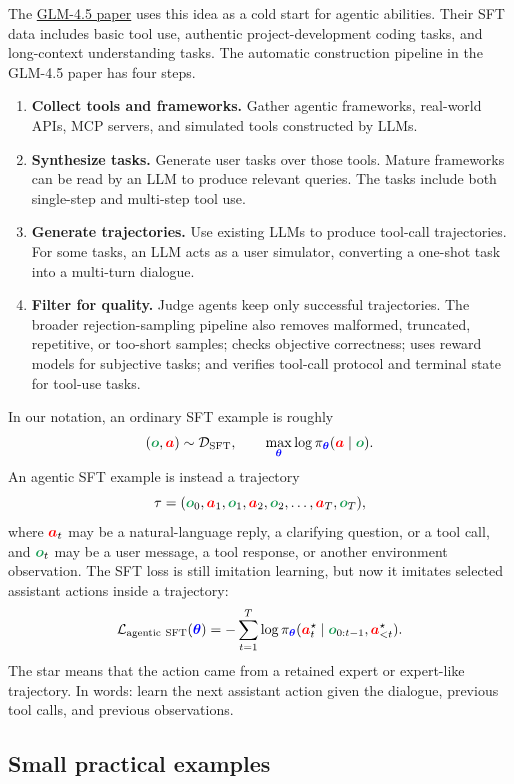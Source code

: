 \documentclass{article}
\newcommand{\colsym}[2]{\ensuremath{\textcolor{#1}{\boldsymbol{#2}}}}
\newcommand{\action}{\colsym{red}{a}}
\newcommand{\obs}{\colsym{ForestGreen}{o}}
\newcommand{\params}{\colsym{blue}{\theta}}
\begin{document}
The \href{https://arxiv.org/pdf/2508.06471}{GLM-4.5 paper} uses this idea as a cold start for agentic abilities. Their SFT data includes basic tool use, authentic project-development coding tasks, and long-context understanding tasks. 
The automatic construction pipeline in the GLM-4.5 paper has four steps.
\begin{enumerate}
    \item \textbf{Collect tools and frameworks.} Gather agentic frameworks, real-world APIs, MCP servers, and simulated tools constructed by LLMs.
    \item \textbf{Synthesize tasks.} Generate user tasks over those tools. Mature frameworks can be read by an LLM to produce relevant queries. The tasks include both single-step and multi-step tool use.
    \item \textbf{Generate trajectories.} Use existing LLMs to produce tool-call trajectories. For some tasks, an LLM acts as a user simulator, converting a one-shot task into a multi-turn dialogue.
    \item \textbf{Filter for quality.} Judge agents keep only successful trajectories. The broader rejection-sampling pipeline also removes malformed, truncated, repetitive, or too-short samples; checks objective correctness; uses reward models for subjective tasks; and verifies tool-call protocol and terminal state for tool-use tasks.
\end{enumerate}

In our notation, an ordinary SFT example is roughly
\[
    (\obs, \action) \sim \mathcal{D}_{\mathrm{SFT}},
    \qquad
    \max_{\params} \log \pi_{\params}(\action \mid \obs).
\]
An agentic SFT example is instead a trajectory
\[
    \tau
    =
    ({\obs}_0,{\action}_1,{\obs}_1,{\action}_2,{\obs}_2,\ldots,{\action}_T,{\obs}_T),
\]
where ${\action}_t$ may be a natural-language reply, a clarifying question, or a tool call, and ${\obs}_t$ may be a user message, a tool response, or another environment observation.
The SFT loss is still imitation learning, but now it imitates selected assistant actions inside a trajectory:
\[
    \mathcal{L}_{\mathrm{agentic\ SFT}}(\params)
    =
    - \sum_{t=1}^{T}
    \log \pi_{\params}({\action}_t^{\star} \mid {\obs}_{0:t-1}, {\action}_{<t}^{\star}).
\]
The star means that the action came from a retained expert or expert-like trajectory. In words: learn the next assistant action given the dialogue, previous tool calls, and previous observations.

\subsection*{Small practical examples}
\end{document}
